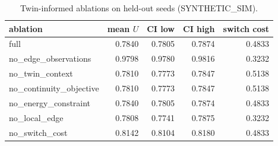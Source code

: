 \begin{table}[h]\centering
\caption{Twin-informed ablations on held-out seeds (SYNTHETIC\_SIM).}
\begin{tabular}{lrrrr}\toprule ablation & mean $U$ & CI low & CI high & switch cost \\\midrule
full & 0.7840 & 0.7805 & 0.7874 & 0.4833 \\
no\_edge\_observations & 0.9798 & 0.9780 & 0.9816 & 0.3232 \\
no\_twin\_context & 0.7810 & 0.7773 & 0.7847 & 0.5138 \\
no\_continuity\_objective & 0.7810 & 0.7773 & 0.7847 & 0.5138 \\
no\_energy\_constraint & 0.7840 & 0.7805 & 0.7874 & 0.4833 \\
no\_local\_edge & 0.7808 & 0.7741 & 0.7875 & 0.3232 \\
no\_switch\_cost & 0.8142 & 0.8104 & 0.8180 & 0.4833 \\
\bottomrule\end{tabular}\end{table}
